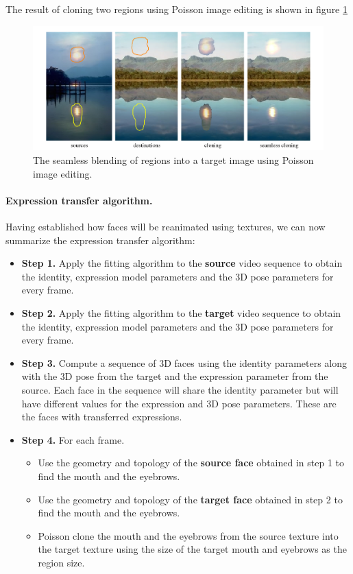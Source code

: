 \documentclass[11pt,a4paper]{report}
\begin{document}
The result of cloning two regions using Poisson image editing is shown in figure \ref{fg:poisson}
\begin{figure}[H]
\begin{centering}
\includegraphics[scale=0.55]{images/cloning.png}
\par\end{centering}

\caption{The seamless blending of regions into a target image using Poisson
  image editing.}
\label{fg:poisson}

\end{figure}

\paragraph{Expression transfer algorithm.}Having established how faces will be reanimated using textures, we can now
summarize the expression transfer algorithm:
\begin{itemize}
\item \textbf{Step 1.} Apply the fitting algorithm to the \textbf{source} video sequence
  to obtain the identity, expression model parameters and the 3D pose parameters
  for every frame.
\item \textbf{Step 2.} Apply the fitting algorithm to the \textbf{target} video sequence
  to obtain the identity, expression model parameters and the 3D pose
  parameters for every frame.
\item \textbf{Step 3.} Compute a sequence of 3D faces using the identity
  parameters along with the 3D pose from the target and the expression parameter
  from the source. Each face in the sequence will share the identity parameter
  but will have different values for the expression and 3D pose
  parameters. These are the faces with transferred expressions.
\item \textbf{Step 4.} For each frame.
\begin{itemize}
\item[\textbullet] Use the geometry and topology of the \textbf{source face} obtained in step 1 to
  find the mouth and the eyebrows.
\item[\textbullet] Use the geometry and topology of the \textbf{target face} obtained in step 2 to
  find the mouth and the eyebrows.
\item[\textbullet] Poisson clone the mouth and the eyebrows from the source texture into
  the target texture using the size of the target mouth and eyebrows as the
  region size.
\end{itemize}
\end{itemize}
\end{document}
